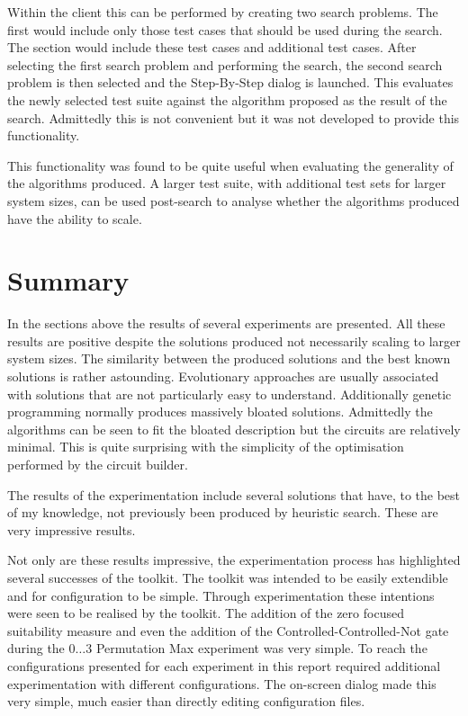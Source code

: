 Within the client this can be performed by creating two search problems.
The first would include only those test cases that should be used during the search.
The section would include these test cases and additional test cases.
After selecting the first search problem and performing the search, the second search problem is then selected and the Step-By-Step dialog is launched.
This evaluates the newly selected test suite against the algorithm proposed as the result of the search.
Admittedly this is not convenient but it was not developed to provide this functionality.

This functionality was found to be quite useful when evaluating the generality of the algorithms produced.
A larger test suite, with additional test sets for larger system sizes, can be used post-search to analyse whether the algorithms produced have the ability to scale.

\section{Summary}

In the sections above the results of several experiments are presented.
All these results are positive despite the solutions produced not necessarily scaling to larger system sizes.
The similarity between the produced solutions and the best known solutions is rather astounding.
Evolutionary approaches are usually associated with solutions that are not particularly easy to understand.
Additionally genetic programming normally produces massively bloated solutions.
Admittedly the algorithms can be seen to fit the bloated description but the circuits are relatively minimal.
This is quite surprising with the simplicity of the optimisation performed by the circuit builder.

The results of the experimentation include several solutions that have, to the best of my knowledge, not previously been produced by heuristic search.
These are very impressive results.

Not only are these results impressive, the experimentation process has highlighted several successes of the toolkit.
The toolkit was intended to be easily extendible and for configuration to be simple.
Through experimentation these intentions were seen to be realised by the toolkit.
The addition of the zero focused suitability measure and even the addition of the Controlled-Controlled-Not gate during the $0\dots{3}$ Permutation Max experiment was very simple.
To reach the configurations presented for each experiment in this report required additional experimentation with different configurations.
The on-screen dialog made this very simple, much easier than directly editing configuration files.







